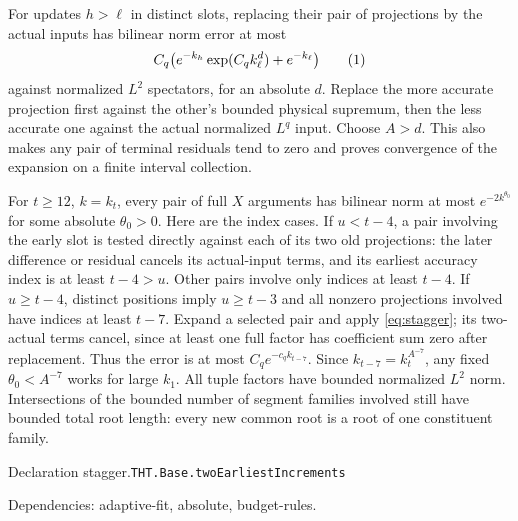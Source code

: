 \documentclass[11pt]{article}
\theoremstyle{definition}
\newcommand{\eqtag}[1]{\refstepcounter{equation}\tag{\theequation}\label{#1}}
\numberwithin{equation}{section}
\newcommand{\bp}[3]{\par\smallskip\begingroup\footnotesize
\noindent\hypertarget{bp:#1}{\textsf{Declaration #1.}}\quad\nolinkurl{#2}\par
\noindent\textsf{Dependencies:} #3.\par\endgroup\smallskip}
\begin{document}
For updates $h>\ell$ in distinct slots, replacing their pair of projections by the actual inputs has bilinear norm error at most
\[
 C_q\bigl(e^{-k_h}\exp(C_qk_\ell^d)+e^{-k_\ell}\bigr)
 \eqtag{eq:stagger}
\]
against normalized $L^2$ spectators, for an absolute $d$. Replace the more accurate projection first against the other's bounded physical supremum, then the less accurate one against the actual normalized $L^q$ input. Choose $A>d$. This also makes any pair of terminal residuals tend to zero and proves convergence of the expansion on a finite interval collection.

For $t\ge12$, $k=k_t$, every pair of full $X$ arguments has bilinear norm at most $e^{-2k^{\theta_0}}$ for some absolute $\theta_0>0$. Here are the index cases. If $u<t-4$, a pair involving the early slot is tested directly against each of its two old projections: the later difference or residual cancels its actual-input terms, and its earliest accuracy index is at least $t-4>u$. Other pairs involve only indices at least $t-4$. If $u\ge t-4$, distinct positions imply $u\ge t-3$ and all nonzero projections involved have indices at least $t-7$. Expand a selected pair and apply \eqref{eq:stagger}; its two-actual terms cancel, since at least one full factor has coefficient sum zero after replacement. Thus the error is at most $C_qe^{-c_qk_{t-7}}$. Since $k_{t-7}=k_t^{A^{-7}}$, any fixed $\theta_0<A^{-7}$ works for large $k_1$. All tuple factors have bounded normalized $L^2$ norm. Intersections of the bounded number of segment families involved still have bounded total root length: every new common root is a root of one constituent family.

\bp{stagger}{THT.Base.twoEarliestIncrements}{adaptive-fit, absolute, budget-rules}
\end{document}
